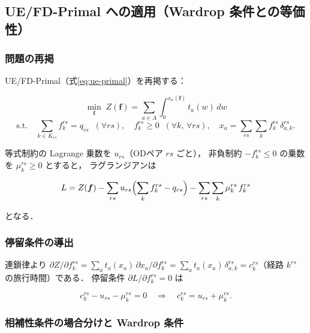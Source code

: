 \subsection{UE/FD-Primal への適用（Wardrop 条件との等価性）}
\label{subsec:appendix-D-ue}

\subsubsection*{問題の再掲}

UE/FD-Primal（式\eqref{eq:ue-primal}）を再掲する：

\begin{equation}
  \min_{\boldsymbol{f}} \;
  Z(\boldsymbol{f}) = \sum_{a \in A} \int_0^{x_a(\boldsymbol{f})} t_a(w)\,dw
  \label{eq:appendix-D-ue-primal}
\end{equation}
\[
  \text{s.t.} \quad
  \sum_{k \in K_{rs}} f_k^{rs} = q_{rs} \;\; (\forall rs),
  \quad
  f_k^{rs} \geq 0 \;\; (\forall k,\, \forall rs),
  \quad
  x_a = \sum_{rs} \sum_k f_k^{rs}\,\delta_{a,k}^{rs}.
\]

等式制約の Lagrange 乗数を $u_{rs}$（ODペア $rs$ ごと），
非負制約 $-f_k^{rs} \leq 0$ の乗数を $\mu_k^{rs} \geq 0$ とすると，
ラグランジアンは

\begin{equation}
  L = Z(\boldsymbol{f})
    - \sum_{rs} u_{rs}\Bigl(\sum_k f_k^{rs} - q_{rs}\Bigr)
    - \sum_{rs} \sum_k \mu_k^{rs}\, f_k^{rs}
  \label{eq:appendix-D-ue-lagrangian}
\end{equation}

となる．

\subsubsection*{停留条件の導出}

連鎖律より
$\partial Z / \partial f_k^{rs}
= \sum_a t_a(x_a)\,\partial x_a / \partial f_k^{rs}
= \sum_a t_a(x_a)\,\delta_{a,k}^{rs}
= c_k^{rs}$（経路 $k^{rs}$ の旅行時間）である．
停留条件 $\partial L / \partial f_k^{rs} = 0$ は

\begin{equation}
  c_k^{rs} - u_{rs} - \mu_k^{rs} = 0
  \quad \Longrightarrow \quad
  c_k^{rs} = u_{rs} + \mu_k^{rs}.
  \label{eq:appendix-D-stationarity}
\end{equation}

\subsubsection*{相補性条件の場合分けと Wardrop 条件}


